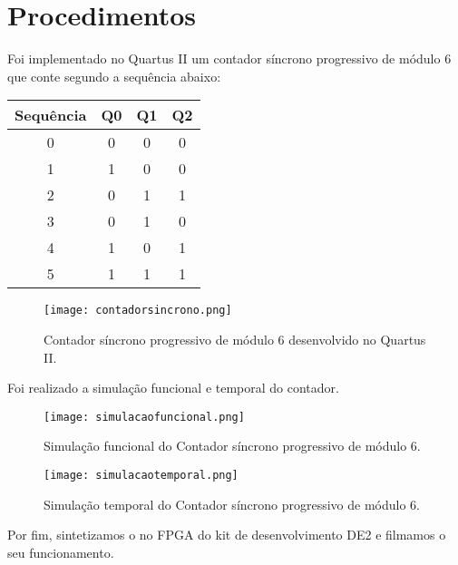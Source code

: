 \documentclass[12pt]{article}
\begin{document}
	\section{Procedimentos}
	\label{sec:Procedimentos}
	
	Foi implementado no Quartus II um contador síncrono progressivo de módulo 6 que conte segundo a sequência abaixo:
	
		\begin{table}[H]
			\centering
			\begin{tabular}{|c|c|c|c|}
				\cline{1-4}
				\multicolumn{1}{|c|}{Sequência} & \multicolumn{1}{|c|}{Q0} & \multicolumn{1}{|c|}{Q1} & \multicolumn{1}{|c|}{Q2}\\
				\hline
				0 & 0 & 0 & 0 \\
				\hline
				1 & 1 & 0 & 0 \\
				\hline
				2 & 0 & 1 & 1 \\
				\hline
				3 & 0 & 1 & 0 \\
				\hline
				4 & 1 & 0 & 1 \\
				\hline
				5 & 1 & 1 & 1 \\
				\hline
			\end{tabular}
		\end{table}
		
		\begin{figure}[H]
			\centering
			\texttt{[image: contadorsincrono.png]}
			\caption{Contador síncrono progressivo de módulo 6 desenvolvido no Quartus II.}
			\label{fig:contadorsincrono}
		\end{figure}
		
		Foi realizado a simulação funcional e temporal do contador.
		
		
		\begin{figure}[H]
			\centering
			\texttt{[image: simulacaofuncional.png]}
			\caption{Simulação funcional do Contador síncrono progressivo de módulo 6.}
			\label{fig:contadorfuncional}
		\end{figure}
		
			\begin{figure}[H]
				\centering
				\texttt{[image: simulacaotemporal.png]}
				\caption{Simulação temporal do Contador síncrono progressivo de módulo 6.}
				\label{fig:contadortemporal}
			\end{figure}
		
		
		Por fim, sintetizamos o no FPGA do kit de desenvolvimento DE2 e filmamos o seu funcionamento.
		
\end{document}
